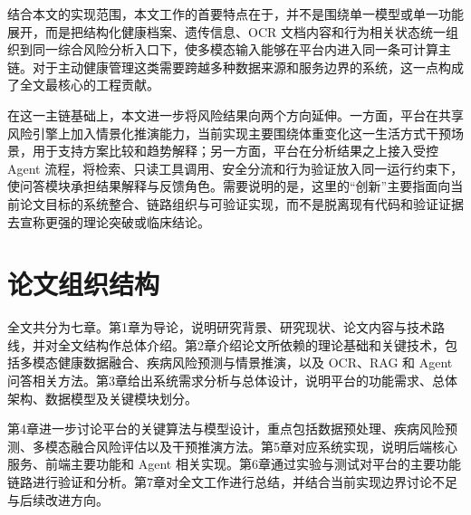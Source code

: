结合本文的实现范围，本文工作的首要特点在于，并不是围绕单一模型或单一功能展开，而是把结构化健康档案、遗传信息、OCR 文档内容和行为相关状态统一组织到同一综合风险分析入口下，使多模态输入能够在平台内进入同一条可计算主链。对于主动健康管理这类需要跨越多种数据来源和服务边界的系统，这一点构成了全文最核心的工程贡献。

在这一主链基础上，本文进一步将风险结果向两个方向延伸。一方面，平台在共享风险引擎上加入情景化推演能力，当前实现主要围绕体重变化这一生活方式干预场景，用于支持方案比较和趋势解释；另一方面，平台在分析结果之上接入受控 Agent 流程，将检索、只读工具调用、安全分流和行为验证放入同一运行约束下，使问答模块承担结果解释与反馈角色。需要说明的是，这里的“创新”主要指面向当前论文目标的系统整合、链路组织与可验证实现，而不是脱离现有代码和验证证据去宣称更强的理论突破或临床结论。

\section{论文组织结构}

全文共分为七章。第1章为导论，说明研究背景、研究现状、论文内容与技术路线，并对全文结构作总体介绍。第2章介绍论文所依赖的理论基础和关键技术，包括多模态健康数据融合、疾病风险预测与情景推演，以及 OCR、RAG 和 Agent 问答相关方法。第3章给出系统需求分析与总体设计，说明平台的功能需求、总体架构、数据模型及关键模块划分。

第4章进一步讨论平台的关键算法与模型设计，重点包括数据预处理、疾病风险预测、多模态融合风险评估以及干预推演方法。第5章对应系统实现，说明后端核心服务、前端主要功能和 Agent 相关实现。第6章通过实验与测试对平台的主要功能链路进行验证和分析。第7章对全文工作进行总结，并结合当前实现边界讨论不足与后续改进方向。
